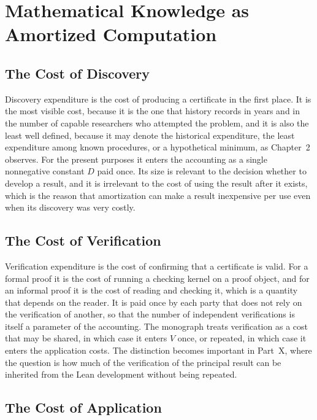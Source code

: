 \documentclass[11pt,letterpaper]{report}
\theoremstyle{plain}
\theoremstyle{definition}
\theoremstyle{remark}
\begin{document}
\chapter{Mathematical Knowledge as Amortized Computation}

\section{The Cost of Discovery}

Discovery expenditure is the cost of producing a certificate in the first place. It is the most visible cost, because it is the one that history records in years and in the number of capable researchers who attempted the problem, and it is also the least well defined, because it may denote the historical expenditure, the least expenditure among known procedures, or a hypothetical minimum, as Chapter~2 observes. For the present purposes it enters the accounting as a single nonnegative constant $D$ paid once. Its size is relevant to the decision whether to develop a result, and it is irrelevant to the cost of using the result after it exists, which is the reason that amortization can make a result inexpensive per use even when its discovery was very costly.

\section{The Cost of Verification}

Verification expenditure is the cost of confirming that a certificate is valid. For a formal proof it is the cost of running a checking kernel on a proof object, and for an informal proof it is the cost of reading and checking it, which is a quantity that depends on the reader. It is paid once by each party that does not rely on the verification of another, so that the number of independent verifications is itself a parameter of the accounting. The monograph treats verification as a cost that may be shared, in which case it enters $V$ once, or repeated, in which case it enters the application costs. The distinction becomes important in Part~X, where the question is how much of the verification of the principal result can be inherited from the Lean development without being repeated.

\section{The Cost of Application}
\end{document}
